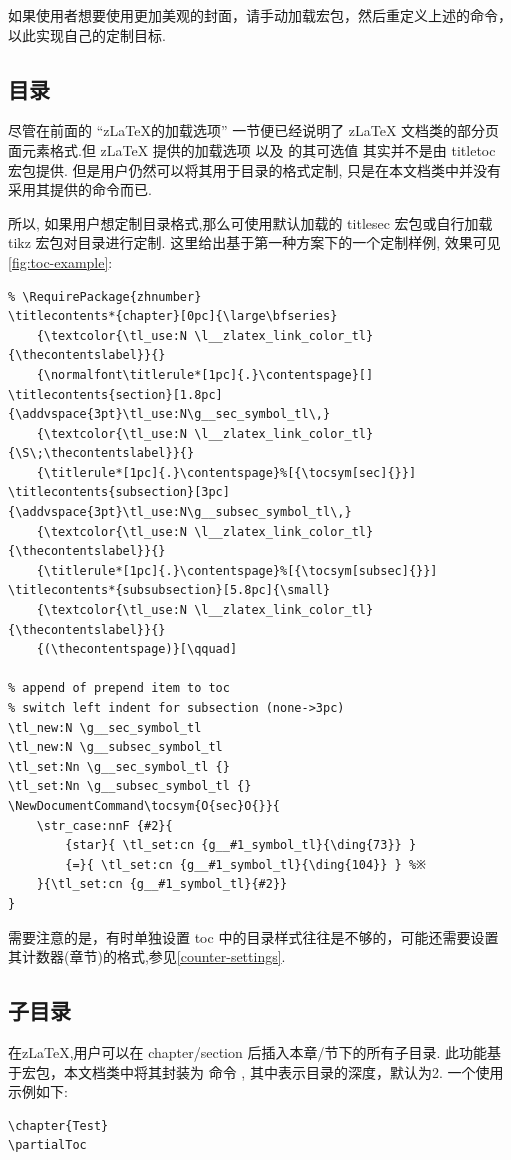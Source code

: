 如果使用者想要使用更加美观的封面，请手动加载宏包，然后重定义上述的\cmd{\maketitle}命令，以此实现自己的定制目标.

\subsection{目录}
尽管在前面的 ``z\LaTeX{}的加载选项'' 一节便已经说明了 z\LaTeX{} 文档类的部分页面元素格式.但 z\LaTeX{} 提供的加载选项 以及
的其可选值 其实并不是由 {titletoc} 宏包提供. 但是用户仍然可以将其用于目录的格式定制, 只是在本文档类中并没有
采用其提供的命令而已. 

所以, 如果用户想定制目录格式,那么可使用默认加载的 {titlesec} 宏包或自行加载 {tikz} 宏包对目录进行定制.
这里给出基于第一种方案下的一个定制样例, 效果可见\cref{fig:toc-example}:
\begin{verbatim}
% \RequirePackage{zhnumber}
\titlecontents*{chapter}[0pc]{\large\bfseries}
    {\textcolor{\tl_use:N \l__zlatex_link_color_tl}{\thecontentslabel}}{}
    {\normalfont\titlerule*[1pc]{.}\contentspage}[]
\titlecontents{section}[1.8pc]{\addvspace{3pt}\tl_use:N\g__sec_symbol_tl\,}
    {\textcolor{\tl_use:N \l__zlatex_link_color_tl}{\S\;\thecontentslabel}}{}
    {\titlerule*[1pc]{.}\contentspage}%[{\tocsym[sec]{}}]
\titlecontents{subsection}[3pc]{\addvspace{3pt}\tl_use:N\g__subsec_symbol_tl\,}
    {\textcolor{\tl_use:N \l__zlatex_link_color_tl}{\thecontentslabel}}{}
    {\titlerule*[1pc]{.}\contentspage}%[{\tocsym[subsec]{}}]
\titlecontents*{subsubsection}[5.8pc]{\small}
    {\textcolor{\tl_use:N \l__zlatex_link_color_tl}{\thecontentslabel}}{}
    {(\thecontentspage)}[\qquad]

% append of prepend item to toc
% switch left indent for subsection (none->3pc)
\tl_new:N \g__sec_symbol_tl
\tl_new:N \g__subsec_symbol_tl
\tl_set:Nn \g__sec_symbol_tl {}
\tl_set:Nn \g__subsec_symbol_tl {}
\NewDocumentCommand\tocsym{O{sec}O{}}{
    \str_case:nnF {#2}{
        {star}{ \tl_set:cn {g__#1_symbol_tl}{\ding{73}} }
        {=}{ \tl_set:cn {g__#1_symbol_tl}{\ding{104}} } %※
    }{\tl_set:cn {g__#1_symbol_tl}{#2}}
} 
\end{verbatim}

需要注意的是，有时单独设置 toc 中的目录样式往往是不够的，可能还需要设置其计数器(章节)的格式,参见\cref{counter-settings}.

\subsection{子目录}
在z\LaTeX{},用户可以在 chapter/section 后插入本章/节下的所有子目录. 此功能基于宏包，本文档类中将其封装为 
命令 \cmd[F]{\partialToc[<depth>]}, 其中表示目录的深度，默认为2. 一个使用示例如下:
\begin{verbatim}
\chapter{Test}
\partialToc
\end{verbatim}

